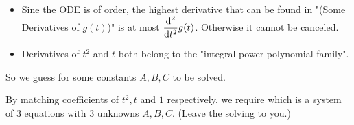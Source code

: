 \documentclass[class=article, crop=false, 12pt]{standalone}
\begin{document}
\hfill\\[-2ex]
\begin{example}

    \begin{itemize}
        \item Sine the ODE is of  order, 
        the highest derivative that can be found in "(Some Derivatives of $g(t)$)" is at most $\dvv[2]{t}g(t)$.
        Otherwise it cannot be canceled.

        \item Derivatives of $t^2$ and $t$ both belong to the "integral power polynomial family".

    \end{itemize}

    So we guess 
    for some constants $A,B,C$ to be solved. 


    By matching coefficients of $t^2, t$ and $1$ respectively, we require
    which is a system of 3 equations with 3 unknowns $A,B,C$. (Leave the solving to you.)\\

\end{example}
\end{document}
